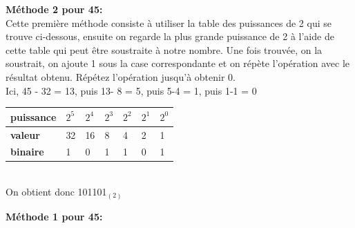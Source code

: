 \begin{Exercice}[5 minutes]
\begin{solution}
    \medskip
    \end{solution}

    \begin{solution}
 \textbf{Méthode 2 pour 45:} \\
        
        Cette première méthode consiste à utiliser la table des puissances de 2 qui se trouve ci-dessous, ensuite on regarde la plus grande puissance de 2 à l'aide de cette table qui peut être soustraite à notre nombre. Une fois trouvée, on la soustrait, on ajoute 1 sous la case correspondante et on répète l'opération avec le résultat obtenu. Répétez l'opération jusqu'à obtenir 0.\\
        
Ici, 45 - 32 = 13, puis 13- 8 = 5, puis 5-4 = 1, puis 1-1 = 0 \\
        
   		\begin{tabular}{| C{0.1\textwidth} | C{0.1\textwidth} | C{0.1\textwidth} | C{0.1\textwidth} | C{0.1\textwidth} | C{0.1\textwidth} | C{0.1\textwidth} |} 
            \hline
            \textbf{puissance} & $2^{5}$ & $2^{4}$ & $2^{3}$ & $2^{2}$ & $2^{1}$ & $2^{0}$ \\ [0.5ex] 
            \hline
            \textbf{valeur} & 32 & 16 & 8 & 4 & 2 & 1 \\ [0.5ex] 
            \hline
            \textbf{binaire} & 1 & 0 & 1 & 1 & 0 & 1 \\ [0.5ex] 
            \hline
        \end{tabular} \\
        
        On obtient donc 101101$_{(2)}$ \\
    \end{solution}

    \begin{solution}
	
	\textbf{Méthode 1 pour 45:} \\
	

\end{solution}
\end{Exercice}
